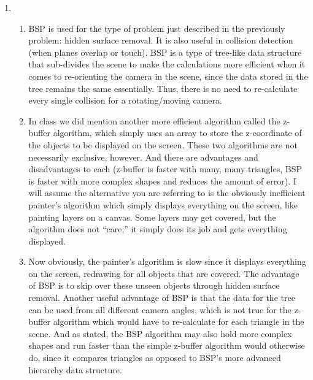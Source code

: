 \documentclass[11pt]{article}
\begin{document}
\begin{enumerate}
  \item
    \begin{enumerate}
      \item BSP is used for the type of problem just described in the previously problem: hidden surface removal. It is also useful in collision detection (when planes overlap or touch). BSP is a type of tree-like data structure that sub-divides the scene to make the calculations more efficient when it comes to re-orienting the camera in the scene, since the data stored in the tree remains the same essentially. Thus, there is no need to re-calculate every single collision for a rotating/moving camera.
      \item In class we did mention another more efficient algorithm called the z-buffer algorithm, which simply uses an array to store the z-coordinate of the objects to be displayed on the screen. These two algorithms are not necessarily exclusive, however. And there are advantages and disadvantages to each (z-buffer is faster with many, many triangles, BSP is faster with more complex shapes and reduces the amount of error). I will assume the alternative you are referring to is the obviously inefficient painter's algorithm which simply displays everything on the screen, like painting layers on a canvas. Some layers may get covered, but the algorithm does not ``care,'' it simply does its job and gets everything displayed.
      \item Now obviously, the painter's algorithm is slow since it displays everything on the screen, redrawing for all objects that are covered. The advantage of BSP is to skip over these unseen objects through hidden surface removal. Another useful advantage of BSP is that the data for the tree can be used from all different camera angles, which is not true for the z-buffer algorithm which would have to re-calculate for each triangle in the scene. And as stated, the BSP algorithm may also hold more complex shapes and run faster than the simple z-buffer algorithm would otherwise do, since it compares triangles as opposed to BSP's more advanced hierarchy data structure.
    \end{enumerate}


\end{enumerate}
\end{document}
